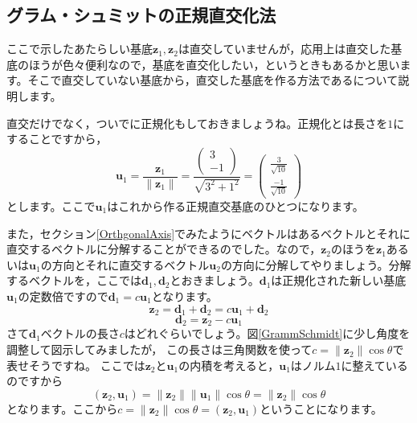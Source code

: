 \documentclass{ltjsbook}
\begin{document}
\subsection{グラム・シュミットの正規直交化法}
\label{GMorth}
ここで示したあたらしい基底$\bm{z}_1,\bm{z}_2$は直交していませんが，応用上は直交した基底のほうが色々便利なので，基底を直交化したい，というときもあるかと思います。そこで直交していない基底から，直交した基底を作る方法であるについて説明します。

直交だけでなく，ついでに正規化もしておきましょうね。正規化とは長さを$1$にすることですから，
\[ \bm{u}_1 = \frac{\bm{z}_1}{\| \bm{z}_1 \|} = \frac{\begin{pmatrix}3\\-1\end{pmatrix}}{\sqrt{3^2+1^2}} = \begin{pmatrix}\frac{3}{\sqrt{10}}\\\frac{-1}{\sqrt{10}}\end{pmatrix}\]
とします。ここで$\bm{u}_1$はこれから作る正規直交基底のひとつになります。

また，セクション\ref{OrthgonalAxis}でみたようにベクトルはあるベクトルとそれに直交するベクトルに分解することができるのでした。なので，$\bm{z}_2$のほうを$\bm{z}_1$あるいは$\bm{u}_1$の方向とそれに直交するベクトル$\bm{u}_2$の方向に分解してやりましょう。分解するベクトルを，ここでは$\bm{d}_1,\bm{d}_2$とおきましょう。$\bm{d}_1$は正規化された新しい基底$\bm{u}_1$の定数倍ですので$\bm{d}_1 = c\bm{u}_1$となります。
\[ \bm{z}_2 = \bm{d}_1 + \bm{d}_2 = c\bm{u}_1 + \bm{d}_2\]
\[ \bm{d}_2 = \bm{z}_2 - c\bm{u}_1 \]
さて$\bm{d}_1$ベクトルの長さ$c$はどれぐらいでしょう。図\ref{GrammSchmidt}に少し角度を調整して図示してみましたが，
この長さは三角関数を使って$c = \|\bm{z}_2\| \cos \theta$で表せそうですね。
ここでは$\bm{z}_2$と$\bm{u}_1$の内積を考えると，$\bm{u}_1$はノルム$1$に整えているのですから
\[ (\bm{z}_2,\bm{u}_1) = \| \bm{z}_2 \| \| \bm{u}_1 \| \cos \theta =\| \bm{z}_2 \| \cos \theta\]
となります。ここから$c= \| \bm{z}_2 \| \cos \theta =(\bm{z}_2,\bm{u}_1) $ということになります。
\end{document}
